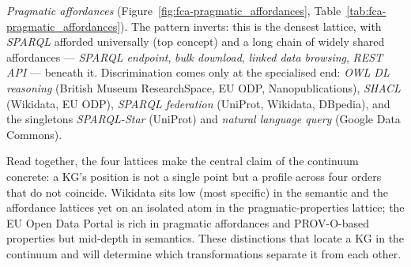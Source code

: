 \documentclass[runningheads]{llncs}
\newenvironment{onlyextended}{\ignorespaces}{\ignorespacesafterend}
\begin{document}
\begin{onlyextended}
\emph{Pragmatic affordances} (Figure~\ref{fig:fca-pragmatic_affordances},
Table~\ref{tab:fca-pragmatic_affordances}). The pattern inverts: this is the
densest lattice, with \emph{SPARQL} afforded universally (top concept) and a
long chain of widely shared affordances --- \emph{SPARQL endpoint},
\emph{bulk download}, \emph{linked data browsing}, \emph{REST API} ---
beneath it. Discrimination comes only at the specialised end:
\emph{OWL DL reasoning} (British Museum ResearchSpace, EU ODP,
Nanopublications), \emph{SHACL} (Wikidata, EU ODP), \emph{SPARQL federation}
(UniProt, Wikidata, DBpedia), and the singletons \emph{SPARQL-Star} (UniProt)
and \emph{natural language query} (Google Data Commons).

Read together, the four lattices make the central claim of the continuum
concrete: a KG's position is not a single point but a profile across four
orders that do not coincide. Wikidata sits low (most specific) in the
semantic and the affordance lattices yet on an isolated atom in the
pragmatic-properties lattice; the EU Open Data Portal is rich in pragmatic
affordances and PROV-O-based properties but mid-depth in semantics. 
These distinctions that locate a KG in the continuum and will determine which transformations separate it from each other.
\end{onlyextended}
\end{document}
